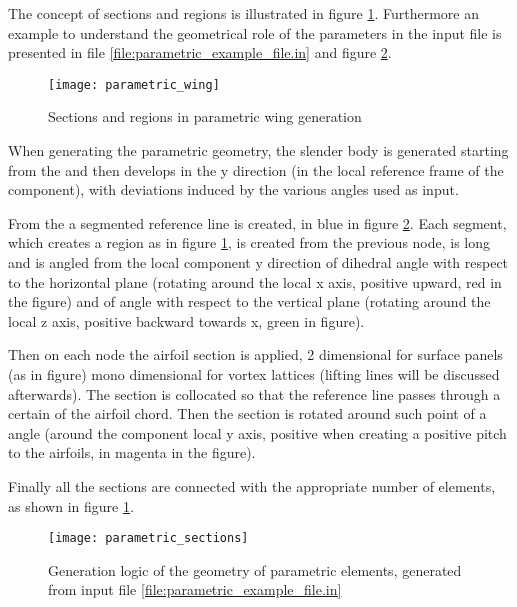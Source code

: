 
The concept of sections and regions is illustrated in figure \ref{fig:parametric_wing}. Furthermore an example to understand the geometrical role of the parameters in the input file is presented in file \ref{file:parametric_example_file.in} and figure \ref{fig:parametric_sections}.

\begin{figure}[h]
\centering
\texttt{[image: parametric\_wing]}
\caption{Sections and regions in parametric wing generation}
\label{fig:parametric_wing}
\end{figure}

When generating the parametric geometry, the slender body is generated starting from the  and then develops in the y direction (in the local reference frame of the component), with deviations induced by the various angles used as input. 

From the  a segmented reference line is created, in blue in figure \ref{fig:parametric_sections}. Each segment, which creates a region as in figure \ref{fig:parametric_wing}, is created from the previous node, is long  and is angled from the local component y direction of  dihedral angle with respect to the horizontal plane (rotating around the local x axis, positive upward, red in the figure) and of  angle with respect to the vertical plane (rotating around the local z axis, positive backward towards x, green in figure). 

Then on each node the airfoil section is applied, 2 dimensional for surface panels (as in figure) mono dimensional for vortex lattices (lifting lines will be discussed afterwards). The section is collocated so that the reference line passes through a certain  of the airfoil chord. Then the section is rotated around such point of a  angle (around the component local y axis, positive when creating a positive pitch to the airfoils, in magenta in the figure). 

Finally all the sections are connected with the appropriate number of elements, as shown in figure \ref{fig:parametric_wing}.

\begin{figure}[h]
\centering
\texttt{[image: parametric\_sections]}
\caption{Generation logic of the geometry of parametric elements, generated from input file \ref{file:parametric_example_file.in}}
\label{fig:parametric_sections}
\end{figure}

